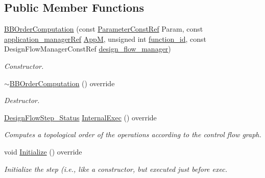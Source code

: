 \subsection*{Public Member Functions}
\begin{DoxyCompactItemize}
\item 
\hyperlink{classBBOrderComputation_a9e29d78ff223ee84cf49d7c4c7e59336}{B\+B\+Order\+Computation} (const \hyperlink{Parameter_8hpp_a37841774a6fcb479b597fdf8955eb4ea}{Parameter\+Const\+Ref} Param, const \hyperlink{application__manager_8hpp_a04ccad4e5ee401e8934306672082c180}{application\+\_\+manager\+Ref} \hyperlink{classFrontendFlowStep_a0ac0d8db2a378416583f51c4faa59d15}{AppM}, unsigned int \hyperlink{classFunctionFrontendFlowStep_a58ef2383ad1a212a8d3f396625a4b616}{function\+\_\+id}, const Design\+Flow\+Manager\+Const\+Ref \hyperlink{classDesignFlowStep_ab770677ddf087613add30024e16a5554}{design\+\_\+flow\+\_\+manager})
\begin{DoxyCompactList}\small\item\em Constructor. \end{DoxyCompactList}\item 
\hyperlink{classBBOrderComputation_a5e70c82b7679fe0adc6306821f5c9d8c}{$\sim$\+B\+B\+Order\+Computation} () override
\begin{DoxyCompactList}\small\item\em Destructor. \end{DoxyCompactList}\item 
\hyperlink{design__flow__step_8hpp_afb1f0d73069c26076b8d31dbc8ebecdf}{Design\+Flow\+Step\+\_\+\+Status} \hyperlink{classBBOrderComputation_aa7ab804417c52182c8e30b5346e210f0}{Internal\+Exec} () override
\begin{DoxyCompactList}\small\item\em Computes a topological order of the operations according to the control flow graph. \end{DoxyCompactList}\item 
void \hyperlink{classBBOrderComputation_a3f9b91887a6fac728cdda5a5cbf92877}{Initialize} () override
\begin{DoxyCompactList}\small\item\em Initialize the step (i.\+e., like a constructor, but executed just before exec. \end{DoxyCompactList}\end{DoxyCompactItemize}
